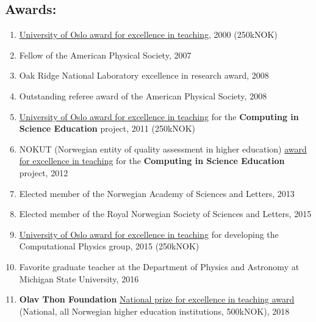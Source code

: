 \documentclass[%
oneside,                 %
final,                   %
10pt]{article}
\begin{document}
\subsection{Awards:}

\begin{enumerate}
\item \href{{http://www.uniforum.uio.no/nyheter/2000/11/det-viktigste-er-aa-inspirere.html}}{University of Oslo award for excellence in teaching}, 2000 (250kNOK)

\item Fellow of the American Physical Society, 2007

\item Oak Ridge National Laboratory excellence in research award, 2008

\item Outstanding referee award of the American Physical Society, 2008

\item \href{{http://www.uniforum.uio.no/nyheter/2011/08/undervisning-for-framtidig-forsking.html}}{University of Oslo award for excellence in teaching} for the \textbf{Computing in Science Education} project, 2011 (250kNOK)

\item NOKUT (Norwegian entity of quality assessment in higher education) \href{{http://www.uniforum.uio.no/nyheter/2012/04/uio-tok-andreplass-i-utdanningskvalitet.html}}{award for excellence in teaching} for the \textbf{Computing in Science Education} project, 2012

\item Elected member of the Norwegian Academy of Sciences and Letters, 2013

\item Elected member of the Royal Norwegian Society of Sciences and Letters, 2015 

\item \href{{http://www.uniforum.uio.no/nyheter/2015/10/instituttet-som-lofter-fram-gode-forelesere.html}}{University of Oslo award for excellence in teaching} for developing the Computational Physics group, 2015 (250kNOK)

\item Favorite graduate teacher at the Department of Physics and Astronomy at Michigan State University, 2016 

\item \textbf{Olav Thon Foundation} \href{{https://www.ntbinfo.no/pressemelding/olav-thon-stiftelsen-annonserte-arets-priser-42-millioner-til-forskning-og-undervisning?publisherId=8983491&releaseId=16475069}}{National prize for excellence in teaching award} (National, all Norwegian higher education institutions, 500kNOK), 2018


\end{enumerate}
\end{document}
